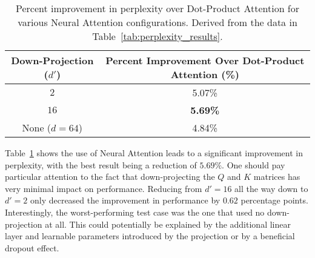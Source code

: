 \documentclass{article}
\begin{document}
\begin{table}[h!]
    \centering
    \caption{Comparison of perplexity results after 1 million iterations.}
    \label{tab:perplexity_results}
    \label{tab:perplexity_results}
\end{table}
\begin{table}[h!]
    \centering
    \caption{Percent improvement in perplexity over Dot-Product Attention for various Neural Attention configurations. Derived from the data in Table~\ref{tab:perplexity_results}.}
    \label{tab:percent_improvement}
    \begin{tabular}{|c|c|}
        \hline
        \textbf{Down-Projection ($d'$)} & \textbf{Percent Improvement Over Dot-Product Attention (\%)} \\ \hline
        $2$                          & 5.07\% \\ \hline
        $16$                         & \textbf{5.69\%} \\ \hline
        None ($d=64$)                & 4.84\% \\ \hline
    \end{tabular}
\end{table}

Table~\ref{tab:percent_improvement} shows the use of Neural Attention leads to a significant improvement in perplexity, with the best result being a reduction of $5.69\%$. One should pay particular attention to the fact that down-projecting the $\mathit{Q}$ and $\mathit{K}$ matrices has very minimal impact on performance. Reducing from $d'=16$ all the way down to $d'=2$ only decreased the improvement in performance by $0.62$ percentage points. Interestingly, the worst-performing test case was the one that used no down-projection at all. This could potentially be explained by the additional linear layer and learnable parameters introduced by the projection or by a beneficial dropout effect.
\end{document}
